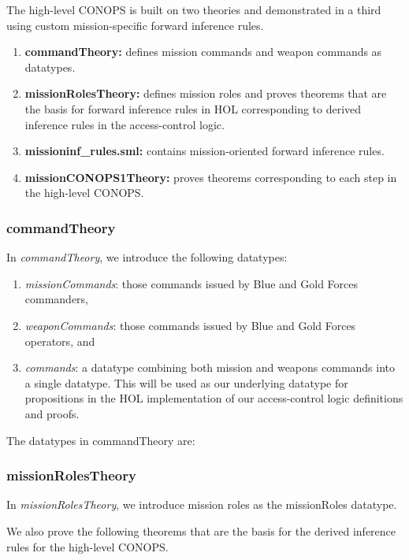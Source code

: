 \documentclass[10pt,twoside]{article}
\begin{document}
The high-level CONOPS is built on two theories and demonstrated in a
third using custom mission-specific forward inference rules.
\begin{enumerate}
\item \textbf{commandTheory:} defines mission commands and weapon
  commands as datatypes.
\item \textbf{missionRolesTheory:} defines mission roles and proves
  theorems that are the basis for forward inference rules in HOL
  corresponding to derived inference rules in the access-control
  logic.
\item \textbf{ missioninf\_rules.sml:} contains mission-oriented
  forward inference rules.
\item \textbf{missionCONOPS1Theory:} proves theorems corresponding to
  each step in the high-level CONOPS.
\end{enumerate}

\subsubsection{commandTheory}
\label{sec:commandTheory}
In \emph{commandTheory}, we introduce the following datatypes:
\begin{enumerate}
\item \emph{missionCommands}: those commands issued by Blue and Gold
  Forces commanders,
\item \emph{weaponCommands}: those commands issued by Blue and Gold
  Forces operators, and
\item \emph{commands}: a datatype combining both mission and weapons
  commands into a single datatype.  This will be used as our
  underlying datatype for propositions in the HOL implementation of
  our access-control logic definitions and proofs.
\end{enumerate}
The datatypes in commandTheory are:
\HOLcommandDatatypesmissionCommands
\HOLcommandDatatypesweaponCommands
\HOLcommandDatatypescommands

\subsubsection{missionRolesTheory}
\label{sec:missionRolesTheory}

In \emph{missionRolesTheory}, we introduce mission roles as the
missionRoles datatype.
\HOLmissionRolesDatatypesmissionRoles

We also prove the following theorems that are the basis for the
derived inference rules for the high-level CONOPS.
\end{document}
